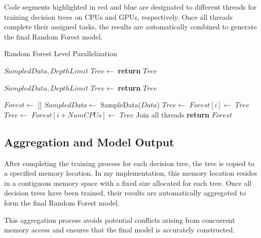 \documentclass[13pt]{article}
\begin{document}
Code segments highlighted in red and blue are designated to different threads for training decision trees on CPUs and GPUs, respectively. Once all threads complete their assigned tasks, the results are automatically combined to generate the final Random Forest model.
\begin{algorithm}[h!]
    \caption{Random Forest Level Parallelization}\label{alg:randomforest}
    \begin{algorithmic}[1]
     {$SampledData, DepthLimit$}
        \State $Tree \gets$ 
        \State \textbf{return} $Tree$
    \EndProcedure

    \State
     {$SampledData, DepthLimit$}
        \State $Tree \gets$ 
        \State \textbf{return} $Tree$
    \EndProcedure
       
    \State
        \State $Forest \gets$ []
        \State $SampledData \gets$ SampleData($Data$)
        \color{red} 
            \State $Tree \gets$ 
            \State $Forest[i] \gets$ $Tree$
        \EndFor \color{black}
        \color{blue} 
            \State $Tree \gets$ 
            \State $Forest[i + NumCPUs] \gets$ $Tree$
        \EndFor \color{black}
        \State Join all threads
        \State \textbf{return} $Forest$
    \EndProcedure
    \end{algorithmic}
\end{algorithm}

\subsection{Aggregation and Model Output}
After completing the training process for each decision tree, the tree is copied to a specified memory location. In my implementation, this memory location resides in a contiguous memory space with a fixed size allocated for each tree. Once all decision trees have been trained, their results are automatically aggregated to form the final Random Forest model.

This aggregation process avoids potential conflicts arising from concurrent memory access and ensures that the final model is accurately constructed.
\end{document}
